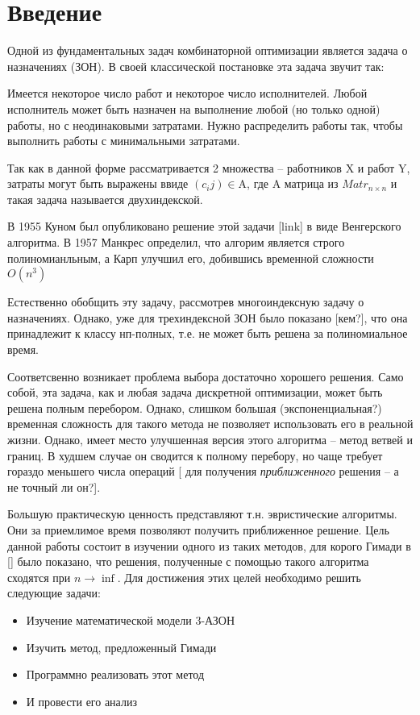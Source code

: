\chapter{Введение}

Одной из фундаментальных задач комбинаторной оптимизации является задача о назначениях (ЗОН). 
В своей классической постановке эта задача звучит так: 

Имеется некоторое число работ и некоторое число исполнителей. Любой исполнитель может быть назначен на выполнение любой (но только одной) работы, но с неодинаковыми затратами. Нужно распределить работы так, чтобы выполнить работы с минимальными затратами.

Так как в данной форме рассматривается 2 множества -- работников $\mathrm{X}$ и работ $\mathrm{Y}$, затраты могут быть выражены ввиде $(c_ij) \in \mathrm{A}$, где $\mathrm{A}$ матрица из $Matr_{n \times n}$ и такая задача называется двухиндекской. 

В 1955 Куном был опубликовано решение этой задачи [link] в виде Венгерского алгоритма. В 1957 Манкрес определил, что 
алгорим является строго полиномианльным, а Карп улучшил его, добившись временной сложности $O(n^3)$

Естественно обобщить эту задачу, рассмотрев многоиндексную задачу о назначениях. Однако, уже 
для трехиндексной ЗОН было показано [кем?], что она принадлежит к классу нп-полных, т.е. не может быть решена за полиномиальное время. 

Соответсвенно возникает проблема выбора достаточно хорошего решения. Само собой, эта задача, как и любая задача дискретной оптимизации, может быть решена полным перебором. Однако, слишком большая (экспоненциальная?) временная сложность для такого метода не позволяет использовать его в реальной жизни. Однако, имеет место улучшенная версия этого алгоритма -- метод ветвей и границ. В худшем случае он сводится к полному перебору, но чаще требует гораздо меньшего числа операций [ для получения \textit{приближенного} решения -- а не точный ли он?].

Большую практическую ценность представляют т.н. эвристические алгоритмы. Они за приемлимое время позволяют получить приближенное решение. Цель данной работы состоит в изучении одного из таких методов, для корого Гимади в [] было показано, что решения, полученные с помощью такого алгоритма сходятся при $n \rightarrow \inf$. Для достижения этих целей необходимо решить следующие задачи: 

\begin{itemize}  
\item Изучение математической модели 3-АЗОН
\item Изучить метод, предложенный Гимади
\item Программно реализовать этот метод
\item И провести его анализ
\end{itemize}
